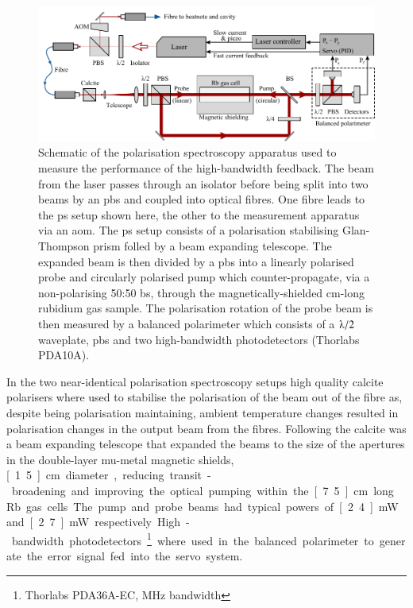 \begin{figure}
\center
\includegraphics[width=\linewidth]{part1/Figs/ps_two_laser.pdf}
\caption{Schematic of the polarisation spectroscopy apparatus used to measure the performance of the high-bandwidth feedback. The beam from the laser passes through an isolator before being split into two beams by an \gls{pbs} and coupled into optical fibres.
One fibre leads to the \gls{ps} setup shown here, the other to the measurement apparatus via an \gls{aom}.
The \gls{ps} setup consists of a polarisation stabilising Glan-Thompson prism folled by a beam expanding telescope.
The expanded beam is then divided by a \gls{pbs} into a linearly polarised probe and circularly polarised pump which counter-propagate, via a non-polarising 50:50 \gls{bs}, through the magnetically-shielded \unit[15]{cm}-long rubidium gas sample.
The polarisation rotation of the probe beam is then measured by a balanced polarimeter which consists of a $\lambdaup/2$ waveplate, \gls{pbs} and two high-bandwidth photodetectors (Thorlabs PDA10A).}
\label{figure:laser_setup}
\end{figure}

In the two near-identical polarisation spectroscopy setups high quality calcite polarisers where used to stabilise the polarisation of the beam out of the fibre as, despite being polarisation maintaining, ambient temperature changes resulted in polarisation changes in the output beam from the fibres.
Following the calcite was a beam expanding telescope that expanded the beams to the size of the apertures in the double-layer mu-metal magnetic shields, \unit[1.5]{cm} diameter, reducing transit-broadening and improving the optical pumping within the \unit[7.5]{cm} long Rb gas cells.
The pump and probe beams had typical powers of \unit[2.4]{mW} and \unit[2.7]{mW} respectively.
High-bandwidth photodetectors\footnote{Thorlabs PDA36A-EC, \unit[150]{MHz} bandwidth} where used in the balanced polarimeter to generate the error signal fed into the servo system.

